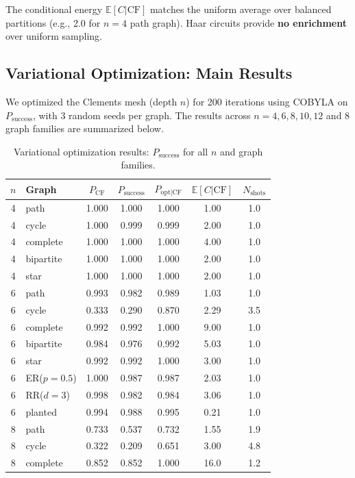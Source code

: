 The conditional energy $\mathbb{E}[C|\mathrm{CF}]$ matches the uniform average over balanced partitions (e.g., 2.0 for $n=4$ path graph). Haar circuits provide \textbf{no enrichment} over uniform sampling.

\subsection{Variational Optimization: Main Results}

We optimized the Clements mesh (depth $n$) for 200 iterations using COBYLA on $P_{\mathrm{success}}$, with 3 random seeds per graph. The results across $n=4,6,8,10,12$ and 8 graph families are summarized below.

\begin{table}[ht]
\centering
\caption{Variational optimization results: $P_{\mathrm{success}}$ for all $n$ and graph families.}
\label{tab:variational_main}
\begin{tabular}{clccccc}
\toprule
$n$ & Graph & $P_{\mathrm{CF}}$ & $P_{\mathrm{success}}$ & $P_{\mathrm{opt|CF}}$ & $\mathbb{E}[C|\mathrm{CF}]$ & $N_{\mathrm{shots}}$ \\
\midrule
4 & path & 1.000 & 1.000 & 1.000 & 1.00 & 1.0 \\
4 & cycle & 1.000 & 0.999 & 0.999 & 2.00 & 1.0 \\
4 & complete & 1.000 & 1.000 & 1.000 & 4.00 & 1.0 \\
4 & bipartite & 1.000 & 1.000 & 1.000 & 2.00 & 1.0 \\
4 & star & 1.000 & 1.000 & 1.000 & 2.00 & 1.0 \\
\midrule
6 & path & 0.993 & 0.982 & 0.989 & 1.03 & 1.0 \\
6 & cycle & 0.333 & 0.290 & 0.870 & 2.29 & 3.5 \\
6 & complete & 0.992 & 0.992 & 1.000 & 9.00 & 1.0 \\
6 & bipartite & 0.984 & 0.976 & 0.992 & 5.03 & 1.0 \\
6 & star & 0.992 & 0.992 & 1.000 & 3.00 & 1.0 \\
6 & ER($p=0.5$) & 1.000 & 0.987 & 0.987 & 2.03 & 1.0 \\
6 & RR($d=3$) & 0.998 & 0.982 & 0.984 & 3.06 & 1.0 \\
6 & planted & 0.994 & 0.988 & 0.995 & 0.21 & 1.0 \\
\midrule
8 & path & 0.733 & 0.537 & 0.732 & 1.55 & 1.9 \\
8 & cycle & 0.322 & 0.209 & 0.651 & 3.00 & 4.8 \\
8 & complete & 0.852 & 0.852 & 1.000 & 16.0 & 1.2 \\

\end{tabular}
\end{table}

